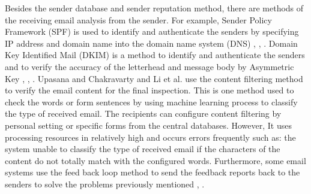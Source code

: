 \documentclass[conference]{IEEEtran}
\begin{document}
Besides the sender database and sender reputation method, there are methods of the receiving email analysis from the sender. 
For example, Sender Policy Framework (SPF) is used to identify and authenticate the senders by specifying IP address and domain name into the domain name system (DNS) \cite{wong}, \cite{NguyenTuanAnh}, \cite{Seike}.
Domain Key Identified Mail (DKIM) is a method to identify and authenticate the senders and to verify the accuracy of the letterhead and message body by Asymmetric Key \cite{crocker}, \cite{Leiba}, \cite{Higashikado}.
Upasana and Chakravarty \cite{upasana} and Li et al. \cite{XiaoJunyong} use the content filtering method to verify the email content for the final inspection. 
This is one method used to check the words or form sentences by using machine learning process to classify the type of received email. 
The recipients can configure content filtering by personal setting or specific forms from the central databases.
However, It uses processing resources in relatively high and occurs errors frequently such as:
the system unable to classify the type of received email if the characters of the content do not totally match
with the configured words. 
Furthermore, some email systems use the feed back loop method to send the feedback reports back to the senders to solve the problems previously mentioned \cite{falk}, \cite{FalkKucherawy}. 
\end{document}
